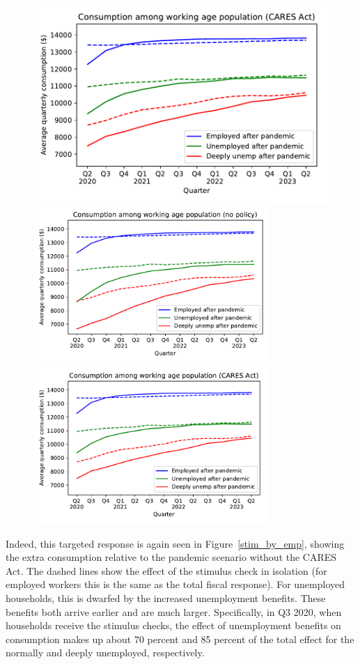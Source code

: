 \documentclass[titlepage,a4paper]{\econtex}
\begin{document}
\begin{figure}
{    \includegraphics[width=0.8\webWidth\textwidth]{./Figures/ConRespByEmpStateWStim}
  } %
  { \includegraphics[width=0.8\textwidth]{./Figures/ConRespByEmpStateNoStim}
    \includegraphics[width=0.8\textwidth]{./Figures/ConRespByEmpStateWStim}}
\end{figure}

Indeed, this targeted response is again seen in Figure~\ref{stim_by_emp},
showing the extra consumption relative to the pandemic scenario without the CARES Act.
The dashed lines show the effect of the stimulus check in isolation (for employed workers this is the same as the total fiscal response).
For unemployed households, this is dwarfed by the increased unemployment benefits.
These benefits both arrive earlier and are much larger.
Specifically, in Q3 2020, when households receive the stimulus checks, the effect of unemployment benefits on consumption makes up about 70 percent and 85 percent of the total effect for the normally and deeply unemployed, respectively.
\end{document}
